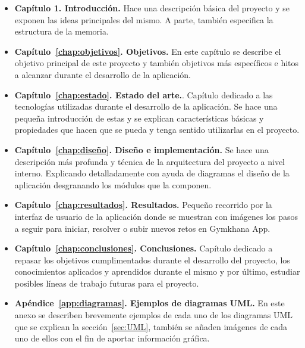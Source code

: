\documentclass[a4paper, 12pt]{book}
\begin{document}
\begin{itemize}
  \item \textbf{Capítulo 1. Introducción.} Hace una descripción básica del proyecto y se exponen las ideas principales del mismo. A parte, también especifica la estructura de la memoria. 
  
  \item \textbf{Capítulo~\ref{chap:objetivos}. Objetivos.} En este capítulo se describe el objetivo principal de este proyecto y también objetivos más específicos e hitos a alcanzar durante el desarrollo de la aplicación.
  
  \item \textbf{Capítulo~\ref{chap:estado}. Estado del arte.}. Capítulo dedicado a las tecnologías utilizadas durante el desarrollo de la aplicación. Se hace una pequeña introducción de estas y se explican características básicas y propiedades que hacen que se pueda y tenga sentido utilizarlas en el proyecto.
  
  \item \textbf{Capítulo~\ref{chap:diseño}. Diseño e implementación.} Se hace una descripción más profunda y técnica de la arquitectura del proyecto a nivel interno. Explicando detalladamente con ayuda de diagramas el diseño de la aplicación desgranando los módulos que la componen.
  
  \item \textbf{Capítulo~\ref{chap:resultados}. Resultados.} Pequeño recorrido por la interfaz de usuario de la aplicación donde se muestran con imágenes los pasos a seguir para iniciar, resolver o subir nuevos retos en Gymkhana App. 
  
  \item \textbf{Capítulo~\ref{chap:conclusiones}. Conclusiones.} Capítulo dedicado a repasar los objetivos cumplimentados durante el desarrollo del proyecto, los conocimientos aplicados y aprendidos durante el mismo y por último, estudiar posibles líneas de trabajo futuras para el proyecto. 
  
  \item \textbf{Apéndice~\ref{app:diagramas}. Ejemplos de diagramas UML.} En este anexo se describen brevemente ejemplos de cada uno de los diagramas UML que se explican la sección~\ref{sec:UML}, también se añaden imágenes de cada uno de ellos con el fin de aportar información gráfica.
\end{itemize}


\end{document}
